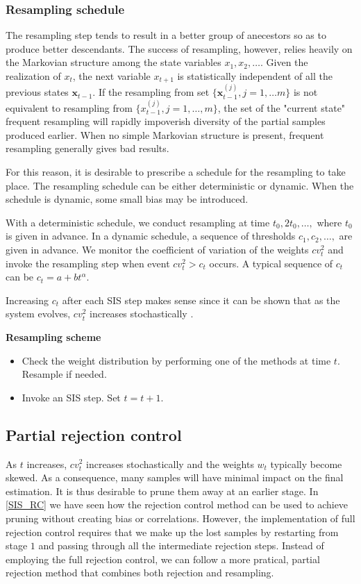 \documentclass[times, utf8, diplomski]{fer}
\begin{document}
\vspace{10mm}

\subsubsection{Resampling schedule}
The resampling step tends to result in a better group of anecestors so  as to produce better descendants. The success of resampling, however, relies heavily on the Markovian structure among the state variables $x_1, x_2, \ldots$. Given the realization of $x_t$, the next variable $x_{t + 1}$ is statistically independent of all the previous states $\mathbf{x}_{t - 1}$. If the resampling from set $\{ \mathbf{x}_{t - 1}^{(j)}, j = 1, \ldots m\}$ is not equivalent to resampling from $\{ x_{t - 1}^{(j)}, j = 1, \ldots, m\}$, the set of the "current state" frequent resampling will rapidly impoverish diversity of the partial samples produced earlier. When no simple Markovian structure is present, frequent resampling generally gives bad results.

For this reason, it is desirable to prescribe a schedule for the resampling to take place. The resampling schedule can be either deterministic or dynamic. When the schedule is dynamic, some small bias may be introduced.

With a deterministic schedule, we conduct resampling at time $t_0, 2t_0, \ldots,$ where $t_0$ is given in advance. In a dynamic schedule, a sequence of thresholds $c_1, c_2, \ldots,$ are given in advance. We monitor the coefficient of variation of the weights $cv_t^2$ and invoke the resampling step when event $cv_t^2 > c_t$ occurs. A typical sequence of $c_t$ can be $c_t = a + bt^\alpha$.

Increasing $c_t$ after each SIS step makes sense since it can be shown that as the system evolves, $cv_t^2$ increases stochastically \cite{Kong94}.

\vspace{10mm}
\textbf{Resampling scheme}
\begin{itemize}
\item{Check the weight distribution by performing one of the methods at time $t$. Resample if needed.}
\item{Invoke an SIS step. Set $t = t + 1$.}
\end{itemize}


\subsection{Partial rejection control}
As $t$ increases, $cv_t^2$ increases stochastically and the weights $w_t$ typically become skewed. As a consequence, many samples  will have minimal impact on the final estimation. It is thus desirable to prune them away at an earlier stage. In \ref{SIS_RC} we have seen how the rejection control method can be used to achieve pruning without creating bias or correlations. However, the implementation of full rejection control requires that we make up the lost samples by restarting from stage $1$ and passing through all the intermediate rejection steps. Instead of employing the full rejection control, we can follow a more pratical, partial rejection method that combines both rejection and resampling. 
\end{document}
